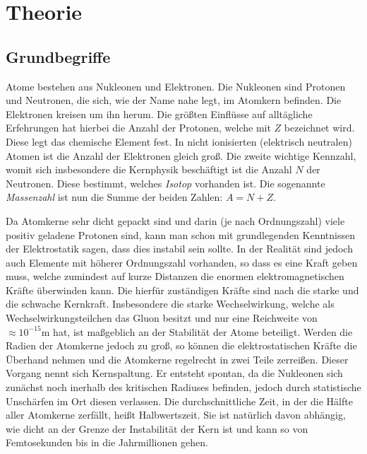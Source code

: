 \documentclass[12pt,a4paper,titlepage,headinclude,bibtotoc]{scrartcl}
\begin{document}
\section{Theorie}
\label{sec:theorie}
\subsection{Grundbegriffe}
Atome bestehen aus Nukleonen und Elektronen.
Die Nukleonen sind Protonen und Neutronen, die sich, wie der Name nahe legt, im Atomkern befinden.
Die Elektronen kreisen um ihn herum.
Die größten Einflüsse auf alltägliche Erfehrungen hat hierbei die Anzahl der Protonen, welche mit $Z$ bezeichnet wird.
Diese legt das chemische Element fest.
In nicht ionisierten (elektrisch neutralen) Atomen ist die Anzahl der Elektronen gleich groß.
Die zweite wichtige Kennzahl, womit sich insbesondere die Kernphysik beschäftigt ist die Anzahl $N$ der Neutronen.
Diese bestimmt, welches \textit{Isotop} vorhanden ist.
Die sogenannte \textit{Massenzahl} ist nun die Summe der beiden Zahlen: $A=N+Z$.

Da Atomkerne sehr dicht gepackt sind und darin (je nach Ordnungszahl) viele positiv geladene Protonen sind, kann man schon mit grundlegenden Kenntnissen der Elektrostatik sagen, dass dies instabil sein sollte.
In der Realität sind jedoch auch Elemente mit höherer Ordnungszahl vorhanden, so dass es eine Kraft geben muss, welche zumindest auf kurze Distanzen die enormen elektromagnetischen Kräfte überwinden kann.
Die hierfür zuständigen Kräfte sind nach \cite[S. 928]{gerthsen} die starke und die schwache Kernkraft.
Insbesondere die starke Wechselwirkung, welche als Wechselwirkungsteilchen das Gluon besitzt und nur eine Reichweite von $\approx10^{-15}\si\metre$ hat, ist maßgeblich an der Stabilität der Atome beteiligt.
Werden die Radien der Atomkerne jedoch zu groß, so können die elektrostatischen Kräfte die Überhand nehmen und die Atomkerne regelrecht in zwei Teile zerreißen.
Dieser Vorgang nennt sich Kernspaltung.
Er entsteht spontan, da die Nukleonen sich zunächst noch inerhalb des kritischen Radiuses befinden, jedoch durch statistische Unschärfen im Ort diesen verlassen.
Die durchschnittliche Zeit, in der die Hälfte aller Atomkerne zerfällt, heißt Halbwertszeit.
Sie ist natürlich davon abhängig, wie dicht an der Grenze der Instabilität der Kern ist und kann so von Femtosekunden bis in die Jahrmillionen gehen.
\end{document}
